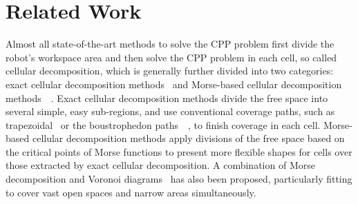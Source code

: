\documentclass[journal]{IEEEtran}
\begin{document}
\section{Related Work}\label{sectionrelatedwork}
Almost all state-of-the-art methods to solve the CPP problem first divide the robot's workspace area and then solve the CPP problem in each cell, so called cellular decomposition, which is generally further divided into two categories: exact cellular decomposition methods~\cite{lumelsky1990dynamic} and Morse-based cellular decomposition methods~\cite{choset2000exact}~\cite{Acar2002Morse}. 
Exact cellular decomposition methods divide the free space into several simple, easy sub-regions, and use conventional coverage paths, such as trapezoidal~\cite{choset2005principles} or the boustrophedon paths~\cite{choset1998coverage}~\cite{choset2000coverage}, to finish coverage in each cell. 
Morse-based cellular decomposition methods apply divisions of the free space based on the critical points of Morse functions to present more flexible shapes for cells over those extracted by exact cellular decomposition. 
A combination of Morse decomposition and Voronoi diagrams~\cite{choset2000sensor-based} has also been proposed, particularly fitting to 
cover vast open spaces and narrow areas simultaneously.
\end{document}
